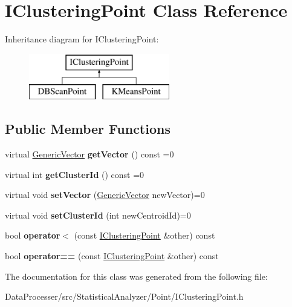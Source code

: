 \hypertarget{classIClusteringPoint}{}\section{I\+Clustering\+Point Class Reference}
\label{classIClusteringPoint}
Inheritance diagram for I\+Clustering\+Point\+:\begin{figure}[H]
\begin{center}
\leavevmode
\includegraphics[height=2.000000cm]{classIClusteringPoint}
\end{center}
\end{figure}
\subsection*{Public Member Functions}
\begin{DoxyCompactItemize}
\item 
\mbox{\label{classIClusteringPoint_a809b5184b30f8fac488345805867fbb2}} 
virtual \hyperlink{classGenericVector}{Generic\+Vector} {\bfseries get\+Vector} () const =0
\item 
\mbox{\label{classIClusteringPoint_a51707c3f5009bac076a2869237e1b3c1}} 
virtual int {\bfseries get\+Cluster\+Id} () const =0
\item 
\mbox{\label{classIClusteringPoint_a9f8f45aa838b3d416cd4130bee795bbd}} 
virtual void {\bfseries set\+Vector} (\hyperlink{classGenericVector}{Generic\+Vector} new\+Vector)=0
\item 
\mbox{\label{classIClusteringPoint_a0f6f914435a436a798d64ac7d118629a}} 
virtual void {\bfseries set\+Cluster\+Id} (int new\+Centroid\+Id)=0
\item 
\mbox{\label{classIClusteringPoint_a42bcbacc21a04dc705657e1e21c15d84}} 
bool {\bfseries operator$<$} (const \hyperlink{classIClusteringPoint}{I\+Clustering\+Point} \&other) const
\item 
\mbox{\label{classIClusteringPoint_aafcde65042318fee89f7e45b0d66ec70}} 
bool {\bfseries operator==} (const \hyperlink{classIClusteringPoint}{I\+Clustering\+Point} \&other) const
\end{DoxyCompactItemize}


The documentation for this class was generated from the following file\+:\begin{DoxyCompactItemize}
\item 
Data\+Processer/src/\+Statistical\+Analyzer/\+Point/I\+Clustering\+Point.\+h\end{DoxyCompactItemize}
